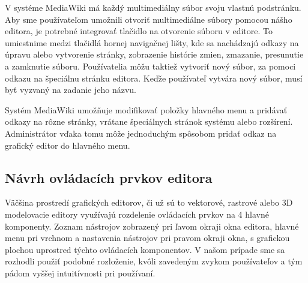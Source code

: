 V systéme MediaWiki má každý multimediálny súbor svoju vlastnú podstránku. Aby sme používateľom umožnili otvoriť multimediálne súbory pomocou nášho editora, je potrebné integrovať tlačidlo na otvorenie súboru v editore. To umiestnime medzi tlačidlá hornej navigačnej lišty, kde sa nachádzajú odkazy na úpravu alebo vytvorenie stránky, zobrazenie histórie zmien, zmazanie, presunutie a zamknutie súboru. Používatelia môžu taktiež vytvoriť nový súbor, za pomoci odkazu na špeciálnu stránku editora. Keďže používateľ vytvára nový súbor, musí byť vyzvaný na zadanie jeho názvu. 

Systém MediaWiki umožňuje modifikovať položky hlavného menu a pridávať odkazy na rôzne stránky, vrátane špeciálnych stránok systému alebo rozšírení. Administrátor vďaka tomu môže jednoduchým spôsobom pridať odkaz na grafický editor do hlavného menu.

\subsection{Návrh ovládacích prvkov editora}
Väčšina prostredí grafických editorov, či už sú to vektorové, rastrové alebo 3D modelovacie editory využívajú rozdelenie ovládacích prvkov na 4 hlavné komponenty. Zoznam nástrojov zobrazený pri ľavom okraji okna editora, hlavné menu pri vrchnom a nastavenia nástrojov pri pravom okraji okna, s grafickou plochou uprostred týchto ovládacích komponentov. V našom prípade sme sa rozhodli použiť podobné rozloženie, kvôli zavedeným zvykom používateľov a tým pádom vyššej intuitívnosti pri používaní.

